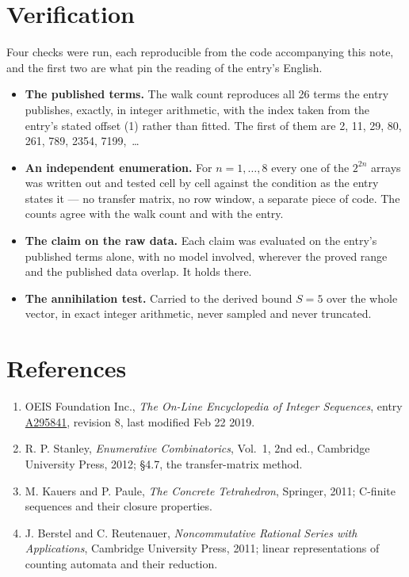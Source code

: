 \documentclass[11pt]{article}
\theoremstyle{definition}
\begin{document}
\section{Verification}

Four checks were run, each reproducible from the code accompanying this note, and the first two are what pin the reading of the entry's English.

\begin{itemize}

\item {\bfseries The published terms.} The walk count reproduces all 26 terms the entry publishes, exactly, in integer arithmetic, with the index taken from the entry's stated offset (1) rather than fitted. The first of them are 2, 11, 29, 80, 261, 789, 2354, 7199,~\dots

\item {\bfseries An independent enumeration.} For $n = 1,\dots,8$ every one of the $2^{2n}$ arrays was written out and tested cell by cell against the condition as the entry states it --- no transfer matrix, no row window, a separate piece of code. The counts agree with the walk count and with the entry.

\item {\bfseries The claim on the raw data.} Each claim was evaluated on the entry's published terms alone, with no model involved, wherever the proved range and the published data overlap. It holds there.

\item {\bfseries The annihilation test.} Carried to the derived bound $S = 5$ over the whole vector, in exact integer arithmetic, never sampled and never truncated.

\end{itemize}

\section{References}

\begin{enumerate}

\item OEIS Foundation Inc., \emph{The On-Line Encyclopedia of Integer Sequences}, entry \href{https://oeis.org/A295841}{A295841}, revision 8, last modified Feb 22 2019.

\item R. P. Stanley, \emph{Enumerative Combinatorics}, Vol.~1, 2nd ed., Cambridge University Press, 2012; \S4.7, the transfer-matrix method.

\item M. Kauers and P. Paule, \emph{The Concrete Tetrahedron}, Springer, 2011; C-finite sequences and their closure properties.

\item J. Berstel and C. Reutenauer, \emph{Noncommutative Rational Series with Applications}, Cambridge University Press, 2011; linear representations of counting automata and their reduction.

\end{enumerate}
\end{document}
